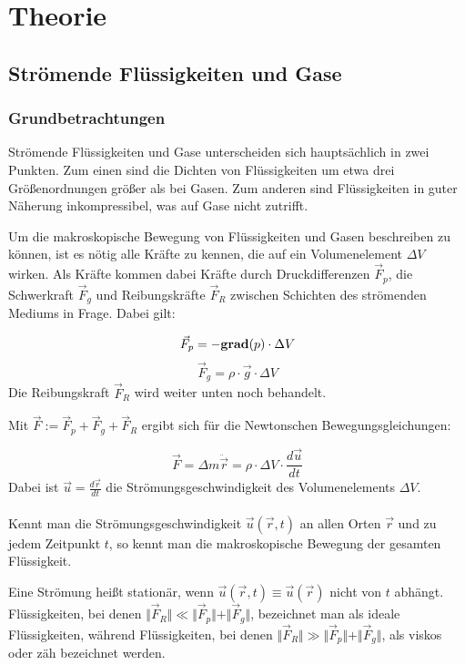 \section{Theorie}
\subsection{Strömende Flüssigkeiten und Gase}

\subsubsection{Grundbetrachtungen}
Strömende Flüssigkeiten und Gase unterscheiden sich hauptsächlich in zwei Punkten. Zum einen sind die Dichten von Flüssigkeiten um etwa drei Größenordnungen größer als bei Gasen. Zum anderen sind Flüssigkeiten in guter Näherung inkompressibel, was auf Gase nicht zutrifft.

Um die makroskopische Bewegung von Flüssigkeiten und Gasen beschreiben zu können, ist es nötig alle Kräfte zu kennen, die auf ein Volumenelement $ \Delta V $ wirken. Als Kräfte kommen dabei Kräfte durch Druckdifferenzen $ \vec{F}_p $, die Schwerkraft $ \vec{F}_g $ und Reibungskräfte $ \vec{F}_R $ zwischen Schichten des strömenden Mediums in Frage. Dabei gilt:

\begin{equation}
\vec{F}_p = -{\bf grad}(p) \cdot \Delta V
\end{equation}
\begin{equation}
\vec{F}_g = \rho \cdot \vec{g} \cdot \Delta V
\end{equation}
Die Reibungskraft $ \vec{F}_R $ wird weiter unten noch behandelt.

Mit $ \vec{F} := \vec{F}_p + \vec{F}_g + \vec{F}_R $ ergibt sich für die Newtonschen Bewegungsgleichungen:

\begin{equation}
\vec{F} = \Delta m \ddot{\vec{r}} = \rho \cdot \Delta V \cdot \frac{d \vec{u}}{dt}
\label{form:Newton}
\end{equation}
Dabei ist $ \vec{u} = \frac{d \vec{r}}{dt} $ die Strömungsgeschwindigkeit des Volumenelements $ \Delta V $.\\
\\Kennt man die Strömungsgeschwindigkeit $ \vec{u} ( \vec{r} , t) $ an allen Orten $ \vec{r} $ und zu jedem Zeitpunkt $ t $, so kennt man die makroskopische Bewegung der gesamten Flüssigkeit.

Eine Strömung heißt stationär, wenn $ \vec{u} ( \vec{r} , t) \equiv \vec{u} ( \vec{r} ) $ nicht von $t$ abhängt.
Flüssigkeiten, bei denen $ \Vert \vec{F}_R \Vert \ll \Vert \vec{F}_p \Vert + \Vert \vec{F}_g \Vert $, bezeichnet man als ideale Flüssigkeiten, während Flüssigkeiten, bei denen $ \Vert \vec{F}_R \Vert \gg \Vert \vec{F}_p \Vert + \Vert \vec{F}_g \Vert $, als viskos oder zäh bezeichnet werden.

